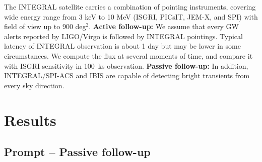 \documentclass[a0,portrait]{a0poster}
\renewcommand{\emph}[1]{\textbf{\color{blue}#1}}
\begin{document}
\begin{multicols}{2}
The INTEGRAL satellite carries a combination of pointing instruments, covering
wide energy range from 3 keV to 10 MeV (ISGRI, PICsIT, JEM-X, and SPI) with
field of view up to 900 deg$^2$. \emph{Active follow-up:} We assume that every
GW alerts reported by LIGO/Virgo is followed by INTEGRAL pointings. Typical
latency of INTEGRAL observation is about 1 day but may be lower in some
circumstances. We compute the flux at several moments of time, and compare it
with ISGRI sensitivity in 100~ks observation. \emph{Passive follow-up:} In
addition, INTEGRAL/SPI-ACS and IBIS are capable of detecting bright transients
from every sky direction.


\section*{Results}

\subsection*{Prompt -- Passive follow-up}


\end{multicols}
\end{document}
